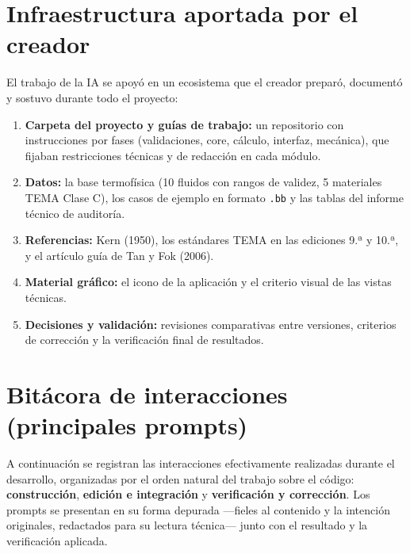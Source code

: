 \documentclass[11pt,a4paper]{article}
\begin{document}
\section{Infraestructura aportada por el creador}

El trabajo de la IA se apoyó en un ecosistema que el creador preparó,
documentó y sostuvo durante todo el proyecto:

\begin{enumerate}
\item \textbf{Carpeta del proyecto y guías de trabajo:} un repositorio con
instrucciones por fases (validaciones, core, cálculo, interfaz, mecánica),
que fijaban restricciones técnicas y de redacción en cada módulo.
\item \textbf{Datos:} la base termofísica (10 fluidos con rangos de validez,
5 materiales TEMA Clase C), los casos de ejemplo en formato \texttt{.bb} y
las tablas del informe técnico de auditoría.
\item \textbf{Referencias:} Kern (1950), los estándares TEMA en las ediciones
9.ª y 10.ª, y el artículo guía de Tan y Fok (2006).
\item \textbf{Material gráfico:} el icono de la aplicación y el criterio
visual de las vistas técnicas.
\item \textbf{Decisiones y validación:} revisiones comparativas entre
versiones, criterios de corrección y la verificación final de resultados.
\end{enumerate}

\section{Bitácora de interacciones (principales prompts)}

A continuación se registran las interacciones efectivamente realizadas
durante el desarrollo, organizadas por el orden natural del trabajo sobre el
código: \textbf{construcción}, \textbf{edición e integración} y
\textbf{verificación y corrección}. Los prompts se presentan en su forma
depurada ---fieles al contenido y la intención originales, redactados para su
lectura técnica--- junto con el resultado y la verificación aplicada.
\end{document}
